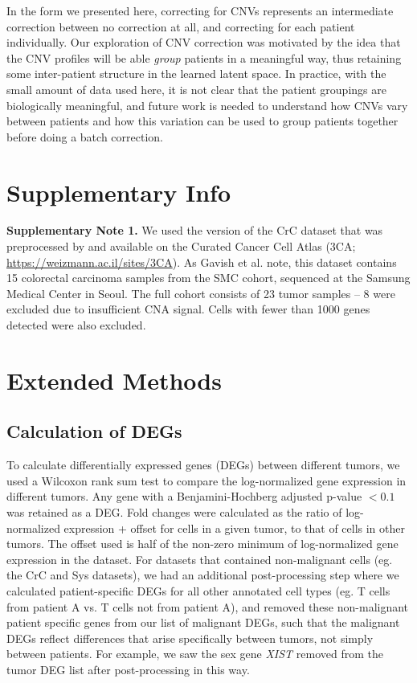 \documentclass{article}
\begin{document}
In the form we presented here, correcting for CNVs represents an intermediate correction between no correction at all, and correcting for each patient individually. Our exploration of CNV correction was motivated by the idea that the CNV profiles will be able \textit{group} patients in a meaningful way, thus retaining some inter-patient structure in the learned latent space. In practice, with the small amount of data used here, it is not clear that the patient groupings are biologically meaningful, and future work is needed to understand how CNVs vary between patients and how this variation can be used to group patients together before doing a batch correction.

\clearpage


\clearpage
\section{Supplementary Info}

\textbf{Supplementary Note 1.} We used the version of the \cite{lee2020lineage} CrC dataset that was preprocessed by \cite{gavish2023hallmarks} and available on the Curated Cancer Cell Atlas (3CA; \url{https://weizmann.ac.il/sites/3CA}). As Gavish et al. note, this dataset contains 15 colorectal carcinoma samples from the SMC cohort, sequenced at the Samsung Medical Center in Seoul. The full cohort consists of 23 tumor samples – 8 were excluded due to insufficient CNA signal. Cells with fewer than 1000 genes detected were also excluded.

\section{Extended Methods}

\subsection{Calculation of DEGs}
To calculate differentially expressed genes (DEGs) between different tumors, we used a Wilcoxon rank sum test to compare the log-normalized gene expression in different tumors. Any gene with a Benjamini-Hochberg adjusted p-value $<0.1$ was retained as a DEG. Fold changes were calculated as the ratio of log-normalized expression + offset for cells in a given tumor, to that of cells in other tumors. The offset used is half of the non-zero minimum of log-normalized gene expression in the dataset. For datasets that contained non-malignant cells (eg. the CrC and Sys datasets), we had an additional post-processing step where we calculated patient-specific DEGs for all other annotated cell types (eg. T cells from patient A vs. T cells not from patient A), and removed these non-malignant patient specific genes from our list of malignant DEGs, such that the malignant DEGs reflect differences that arise specifically between tumors, not simply between patients. For example, we saw the sex gene \textit{XIST} removed from the tumor DEG list after post-processing in this way.
\end{document}
